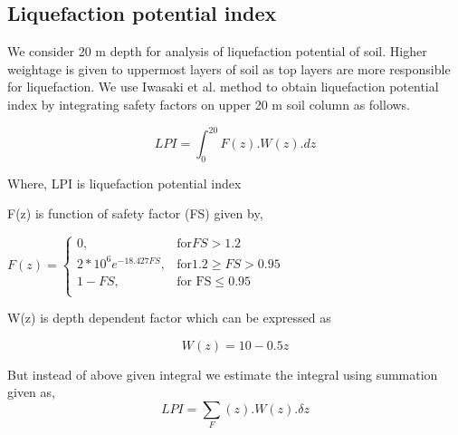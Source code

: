 \subsection{Liquefaction potential index}
We consider 20 m depth for analysis of liquefaction potential of soil. Higher weightage is given to uppermost layers of soil as top layers are more responsible for liquefaction. We use Iwasaki et al. method to obtain liquefaction potential index by integrating safety factors on upper 20 m soil column as follows.

\begin{equation}
LPI = \int_{0}^{20} F(z).W(z).dz
\end{equation}

Where,
LPI is liquefaction potential index 

F(z) is function of safety factor (FS) given by,

\begin{math}
F(z) = \begin{cases}
	0, & \text{for} FS > 1.2 \\
	2*10^6 e^{-18.427 FS}, & \text{for} 1.2 \geq FS > 0.95 \\
	1-FS, & \text{for FS} \leq 0.95 \\
	\end{cases}
\end{math}

W(z) is  depth dependent factor which can be expressed as 

\begin{equation}
W(z) = 10 - 0.5 z
\end{equation}

But instead of above given integral we estimate the integral using summation given as,
\begin{equation}
LPI = \sum_ F(z).W(z). \delta z
\end{equation}